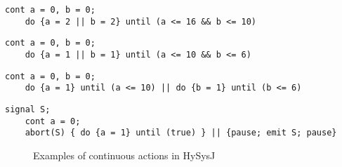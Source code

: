 \documentclass[10pt,journal,cspaper,compsoc]{IEEEtran}
\begin{document}
\newbox{\cls}
\begin{lrbox}{\cls}
  \begin{lstlisting}[mathescape,style=sysj,morekeywords={until,cont,signal,loop,abort,await,emit,present,trap,pause,exit,delay,suspend}]
    cont a = 0, b = 0; 
    do {a = 2 || b = 2} until (a <= 16 && b <= 10)
  \end{lstlisting}
\end{lrbox}

\newbox{\clfi}
\begin{lrbox}{\clfi}
  \begin{lstlisting}[mathescape,style=sysj,morekeywords={until,cont,signal,loop,abort,await,emit,present,trap,pause,exit,delay,suspend}]
    cont a = 0, b = 0;
    do {a = 1 || b = 1} until (a <= 10 && b <= 6)
  \end{lstlisting}
\end{lrbox}

\newbox{\clt}
\begin{lrbox}{\clt}
  \begin{lstlisting}[mathescape,style=sysj,morekeywords={until,cont,signal,loop,abort,await,emit,present,trap,pause,exit,delay,suspend}]
    cont a = 0, b = 0; 
    do {a = 1} until (a <= 10) || do {b = 1} until (b <= 6)
  \end{lstlisting}
\end{lrbox}

\newbox{\clff}
\begin{lrbox}{\clff}
  \begin{lstlisting}[mathescape,style=sysj,morekeywords={until,cont,signal,loop,abort,await,emit,present,trap,pause,exit,delay,suspend}]
    signal S;
    cont a = 0; 
    abort(S) { do {a = 1} until (true) } || {pause; emit S; pause}
  \end{lstlisting}
\end{lrbox}

\begin{figure}[t!]
  \centering
  



  \caption{Examples of continuous actions in HySysJ}
  \label{fig:12}
\end{figure}
\end{document}

